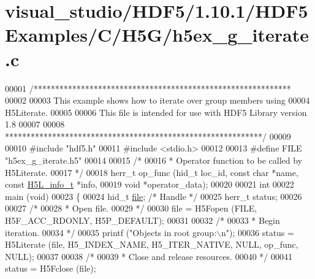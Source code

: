 \hypertarget{visual__studio_2_h_d_f5_21_810_81_2_h_d_f5_examples_2_c_2_h5_g_2h5ex__g__iterate_8c_source}{}\section{visual\+\_\+studio/\+H\+D\+F5/1.10.1/\+H\+D\+F5\+Examples/\+C/\+H5\+G/h5ex\+\_\+g\+\_\+iterate.c}
\label{visual__studio_2_h_d_f5_21_810_81_2_h_d_f5_examples_2_c_2_h5_g_2h5ex__g__iterate_8c_source}

\begin{DoxyCode}
00001 \textcolor{comment}{/************************************************************}
00002 \textcolor{comment}{}
00003 \textcolor{comment}{  This example shows how to iterate over group members using}
00004 \textcolor{comment}{  H5Literate.}
00005 \textcolor{comment}{}
00006 \textcolor{comment}{  This file is intended for use with HDF5 Library version 1.8}
00007 \textcolor{comment}{}
00008 \textcolor{comment}{ ************************************************************/}
00009 
00010 \textcolor{preprocessor}{#include "hdf5.h"}
00011 \textcolor{preprocessor}{#include <stdio.h>}
00012 
00013 \textcolor{preprocessor}{#define FILE       "h5ex\_g\_iterate.h5"}
00014 
00015 \textcolor{comment}{/*}
00016 \textcolor{comment}{ * Operator function to be called by H5Literate.}
00017 \textcolor{comment}{ */}
00018 herr\_t op\_func (hid\_t loc\_id, \textcolor{keyword}{const} \textcolor{keywordtype}{char} *name, \textcolor{keyword}{const} \hyperlink{struct_h5_l__info__t}{H5L\_info\_t} *info,
00019             \textcolor{keywordtype}{void} *operator\_data);
00020 
00021 \textcolor{keywordtype}{int}
00022 main (\textcolor{keywordtype}{void})
00023 \{
00024     hid\_t           \hyperlink{structfile}{file};           \textcolor{comment}{/* Handle */}
00025     herr\_t          status;
00026 
00027     \textcolor{comment}{/*}
00028 \textcolor{comment}{     * Open file.}
00029 \textcolor{comment}{     */}
00030     file = H5Fopen (FILE, H5F\_ACC\_RDONLY, H5P\_DEFAULT);
00031 
00032     \textcolor{comment}{/*}
00033 \textcolor{comment}{     * Begin iteration.}
00034 \textcolor{comment}{     */}
00035     printf (\textcolor{stringliteral}{"Objects in root group:\(\backslash\)n"});
00036     status = H5Literate (file, H5\_INDEX\_NAME, H5\_ITER\_NATIVE, NULL, op\_func, NULL);
00037 
00038     \textcolor{comment}{/*}
00039 \textcolor{comment}{     * Close and release resources.}
00040 \textcolor{comment}{     */}
00041     status = H5Fclose (file);

\end{DoxyCode}
